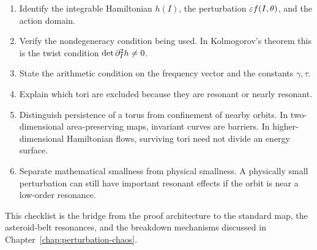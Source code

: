 \begin{enumerate}
\item Identify the integrable Hamiltonian \(h(I)\), the perturbation
\(\varepsilon f(I,\theta)\), and the action domain.
\item Verify the nondegeneracy condition being used.  In Kolmogorov's theorem
this is the twist condition \(\det \partial_I^2h\ne0\).
\item State the arithmetic condition on the frequency vector and the constants
\(\gamma,\tau\).
\item Explain which tori are excluded because they are resonant or nearly
resonant.
\item Distinguish persistence of a torus from confinement of nearby orbits.
In two-dimensional area-preserving maps, invariant curves are barriers.  In
higher-dimensional Hamiltonian flows, surviving tori need not divide an energy
surface.
\item Separate mathematical smallness from physical smallness.  A physically
small perturbation can still have important resonant effects if the orbit is
near a low-order resonance.
\end{enumerate}

This checklist is the bridge from the proof architecture to the standard map,
the asteroid-belt resonances, and the breakdown mechanisms discussed in
Chapter~\ref{chap:perturbation-chaos}.
